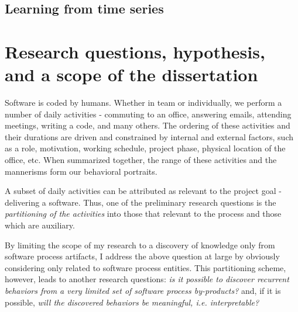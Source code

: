 \subsection{Learning from time series}

\section{Research questions, hypothesis, and a scope of the dissertation}
Software is coded by humans. Whether in team or individually, we perform a number of daily activities - 
commuting to an office, answering emails, attending meetings, writing a code, and many others. 
The ordering of these activities and their durations are driven and constrained by internal and external factors, 
such as a role, motivation, working schedule, project phase, physical location of the office, etc. 
When summarized together, the range of these activities and the mannerisms form our behavioral portraits.

A subset of daily activities can be attributed as relevant to the project goal - delivering a software. 
Thus, one of the preliminary research questions is the \textit{partitioning of the activities} into those that 
relevant to the process and those which are auxiliary. 


By limiting the scope of my research to a discovery of knowledge only from software process artifacts, 
I address the above question at large by obviously considering only related to software process entities.
This partitioning scheme, however, leads to another research questions: \textit{is it possible to discover 
recurrent behaviors from a very limited set of software process by-products?} and, if it is possible, 
\textit{will the discovered behaviors be meaningful, i.e. interpretable?}

